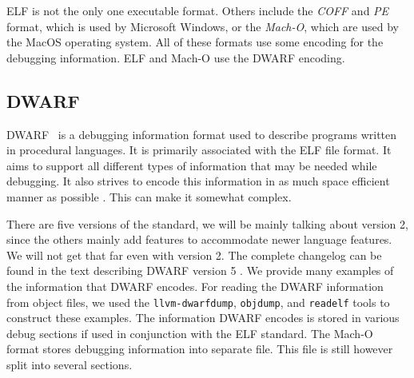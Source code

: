 ELF is not the only one executable format. Others include the \textit{COFF} and
\textit{PE} format, which is used by Microsoft Windows, or the \textit{Mach-O},
which are used by the MacOS operating system. All of these formats use some
encoding for the debugging information. ELF and Mach-O use the DWARF encoding.

\subsection{DWARF}
DWARF~\cite{dwarf} is a debugging information format used to describe programs
written in procedural languages. It is primarily associated with the ELF file
format. It aims to support all different types of information that may be
needed while debugging. It also strives to encode this information in as much
space efficient manner as possible \cite{dwarf}. This can make it somewhat
complex. 

There are five versions of the standard, we will be mainly talking about
version 2, since the others mainly add features to accommodate newer language
features. We will not get that far even with version 2. The complete changelog
can be found in the text describing DWARF version 5 \cite{dwarf-5}. We provide
many examples of the information that DWARF encodes. For reading the DWARF
information from object files, we used the \texttt{llvm-dwarfdump},
\texttt{objdump}, and \texttt{readelf} tools to construct these
examples. The information DWARF encodes
is stored in various debug sections if used in conjunction with the ELF
standard. The Mach-O format stores debugging information into separate file.
This file is still however split into several sections.

